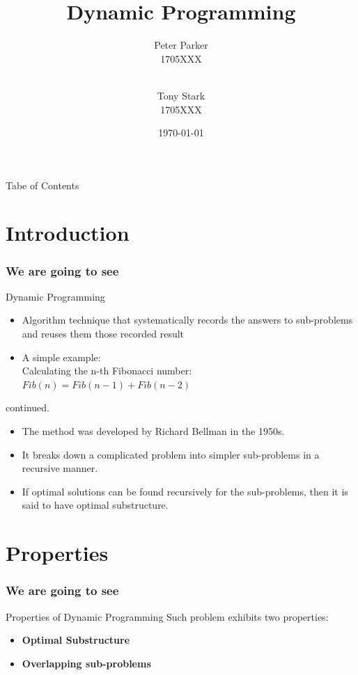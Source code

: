 \documentclass{beamer}
\title{Dynamic Programming}
\author[1705XXX, 1705XXX]{Peter Parker \\ 1705XXX \and \\ Tony Stark \\ 1705XXX}
\date{\today}
\begin{document}
\frame{\titlepage}

\begin{frame}{Tabe of Contents}
    \tableofcontents
\end{frame}

\section{Introduction}

\begin{frame}
\frametitle{We are going to see}

    \tableofcontents
\end{frame}
\begin{frame}{Dynamic Programming}
\begin{itemize}
    \item Algorithm technique that systematically records the answers
to sub-problems and reuses them those recorded result
\pause
\item A simple example: \\
Calculating the n-th Fibonacci number: \\
$Fib(n) = Fib(n-1) + Fib(n-2)$
\end{itemize}
\end{frame}
\begin{frame}{continued.}
\begin{itemize}
    \item The method was developed by Richard Bellman in the 1950s.
    \pause
    \item It breaks down a complicated problem into simpler
sub-problems in a recursive manner.
    \pause
    \item If optimal solutions can be found recursively for the
sub-problems, then it is said to have optimal substructure.
\end{itemize}
    
\end{frame}


\section{Properties}

\begin{frame}
\frametitle{We are going to see}

    \tableofcontents
\end{frame}

\begin{frame}{Properties of Dynamic Programming}
Such problem exhibits two properties:
\begin{itemize}
    \item \textbf{Optimal Substructure}
    \item \textbf{Overlapping sub-problems}
\end{itemize}
\end{frame}
\end{document}
